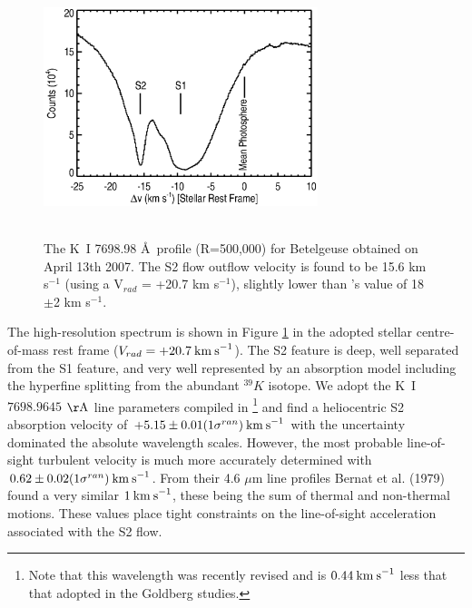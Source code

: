 \documentclass[iop]{emulateapj}
\begin{document}
\begin{figure}
\includegraphics[trim=40pt 0pt 50pt 0pt, width=8.0cm, height=7.5cm]{f18.eps}
\caption{The K~I 7698.98 \AA \  profile (R=500,000) for Betelgeuse obtained on April 13th 2007. The S2 flow outflow velocity is found to be 15.6 km s${}^{-1}$ (using a V$_{rad}$ = +20.7 km s${}^{-1}$), slightly lower than \citeauthor{2002A&A...386.1009P}'s \citeyearpar{2002A&A...386.1009P} value of 18$\pm$2 km s${}^{-1}$.}
\label{fig:fig7}
\end{figure}

The high-resolution spectrum is shown in Figure \ref{fig:fig7} in the adopted stellar centre-of-mass rest frame ($V_{rad}=+20.7\>{\rm km\>s}^{-1}$). The S2 feature is deep, well separated from the S1 feature, and very well represented by an absorption model including the hyperfine splitting from the abundant $^{39}K$ isotope. We adopt the K~I $7698.9645$ $\rm{\AA}$ line parameters compiled in \cite{2003ApJS..149..205M}\footnote{Note that this wavelength was recently revised and is $0.44\>{\rm km\>s}^{-1}$ less that that adopted in the Goldberg studies.} and find a heliocentric S2 absorption velocity of $+5.15\pm 0.01(1\sigma^{ran})\>{\rm km\>s}^{-1}$ with the uncertainty dominated the absolute wavelength scales. However, the most probable line-of-sight turbulent velocity is much more accurately determined with $0.62\pm 0.02(1\sigma^{ran}) \>{\rm km\>s}^{-1}$. From their 4.6 $\mu$m line profiles Bernat et al. (1979) found a very similar $1\>{\rm km\>s}^{-1}$, these being the sum of thermal and non-thermal motions. These values place tight constraints on the line-of-sight 
acceleration associated with the S2 flow. 
\end{document}
